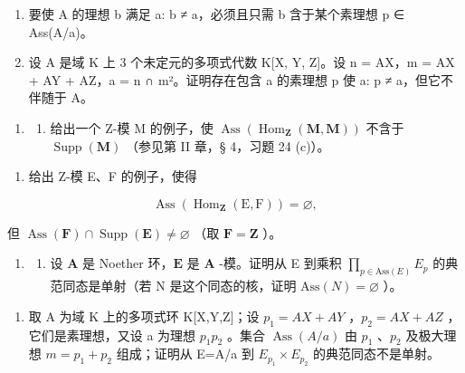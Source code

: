\begin{enumerate}
\def\labelenumi{(\alph{enumi})}
\item
  要使 A 的理想 b 满足 a: b ≠ a，必须且只需 b 含于某个素理想 p ∈ Ass(A/a)。
\item
  设 A 是域 K 上 3 个未定元的多项式代数 K{[}X, Y, Z{]}。设 n = AX，m = AX + AY + AZ，a = n ∩ m²。证明存在包含 a 的素理想 p 使 a: p ≠ a，但它不伴随于 A。
\end{enumerate}

\begin{enumerate}
\def\labelenumi{\arabic{enumi}.}
\setcounter{enumi}{9}
\tightlist
\item
  \begin{enumerate}
  \def\labelenumii{(\alph{enumii})}
  \tightlist
  \item
    给出一个 Z-模 M 的例子，使 \(\operatorname{Ass}(\operatorname{Hom}_{\mathbf{Z}}(\mathbf{M}, \mathbf{M}))\) 不含于 \(\operatorname{Supp}(\mathbf{M})\) （参见第 II 章，§ 4，习题 24 (c)）。
  \end{enumerate}
\end{enumerate}

\begin{enumerate}
\def\labelenumi{(\alph{enumi})}
\setcounter{enumi}{1}
\tightlist
\item
  给出 Z-模 E、F 的例子，使得
\end{enumerate}

\[
\operatorname{Ass} \left(\operatorname{Hom} _ {\mathbf {Z}} (\mathrm{E}, \mathrm{F})\right) = \varnothing ,
\]

但 \(\operatorname{Ass}(\mathbf{F}) \cap \operatorname{Supp}(\mathbf{E}) \neq \varnothing\) （取 \(\mathbf{F} = \mathbf{Z}\) ）。

\begin{enumerate}
\def\labelenumi{\arabic{enumi}.}
\setcounter{enumi}{10}
\tightlist
\item
  \begin{enumerate}
  \def\labelenumii{(\alph{enumii})}
  \tightlist
  \item
    设 \(\mathbf{A}\) 是 Noether 环，\(\mathbf{E}\) 是 \(\mathbf{A}\) -模。证明从 E 到乘积 \(\prod_{p\in\text{Ass}(E)}E_p\) 的典范同态是单射（若 N 是这个同态的核，证明 \(\text{Ass}(N)=\varnothing\) ）。
  \end{enumerate}
\end{enumerate}

\begin{enumerate}
\def\labelenumi{(\alph{enumi})}
\setcounter{enumi}{1}
\tightlist
\item
  取 A 为域 K 上的多项式环 K{[}X,Y,Z{]}；设 \(p_{1}=AX+AY\) ，\(p_{2}=AX+AZ\) ，它们是素理想，又设 a 为理想 \(p_{1}p_{2}\) 。集合 \(\operatorname{Ass}(A/a)\) 由 \(p_{1}\) 、\(p_{2}\) 及极大理想 \(m=p_{1}+p_{2}\) 组成；证明从 E=A/a 到 \(E_{p_{1}}\times E_{p_{2}}\) 的典范同态不是单射。
\end{enumerate}

